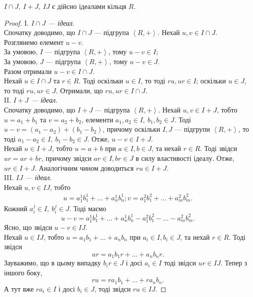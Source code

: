 \documentclass{math_library}
\begin{document}
\begin{proposition}
$I \cap J,\ I + J,\ IJ$ є дійсно ідеалами кільця $R$.
\end{proposition}

\begin{proof}
I. \textit{$I \cap J$ --- ідеал}.\\
Спочатку доводимо, що $I \cap J$ --- підгрупа $\left< R, + \right>$. Нехай $u,v \in I \cap J$. Розглянемо елемент $u-v$.\\
За умовою, $I$ --- підгрупа $\left<R,+\right>$, тому $u-v \in I$;\\
За умовою, $J$ --- підгрупа $\left<R,+\right>$, тому $u-v \in J$.\\
Разом отримали $u-v \in I \cap J$.\\
Нехай $u \in I \cap J$ та $r \in R$. Тоді оскільки $u \in I$, то тоді $ru, ur \in I$; оскільки $u \in J$, то тоді $ru, ur \in J$. Отримали, що $ru, ur \in I \cap J$.
\bigskip \\
II. \textit{$I+J$ --- ідеал}.\\
Спочатку доводимо, що $I + J$ --- підгрупа $\left< R, + \right>$. Нехай $u,v \in I + J$, тобто $u = a_1 + b_1$ та $v = a_2 + b_2$, елементи $a_1,a_2 \in I,\ b_1,b_2 \in J$. Тоді $u - v = (a_1 - a_2) + (b_1 - b_2)$, причому оскільки $I,J$ --- підгрупи $\left< R,+ \right>$, то тоді $a_1 - a_2 \in I,\ b_1 - b_2 \in J$. Отже, $u-v \in I+J$.\\
Нехай $u \in I+J$, тобто $u = a+b$ при $a \in I,b \in J$, та нехай $r \in R$. Тоді звідси $ur = ar + br$, причому звідси $ar \in I, br \in J$ в силу властивості ідеалу. Отже, $ur \in I+J$. Аналогічним чином доводиться $ru \in I+J$.
\bigskip \\
III. \textit{$IJ$ --- ідеал}.\\
Нехай $u,v \in IJ$, тобто
\begin{align*}
u = a_1^1 b_1^1 + \dots + a_n^1 b_n^1;
v = a_1^2 b_1^2 + \dots + a_m^2 b_m^2.
\end{align*}
Кожний $a_i^j \in I,\ b_i^j \in J$. Тоді маємо
\[
u - v = a_1^1 b_1^1 + \dots + a_n^1 b_n^1 - a_1^2 b_1^2 - \dots - a_m^2 b_m^2.
\]
Ясно, що звідси $u - v \in IJ$.\\
Нехай $u \in IJ$, тобто $u = a_1b_1 + \dots + a_nb_n$ при $a_i \in I, b_i \in J$, та нехай $r \in R$. Тоді звідси
\[
ur = a_1 b_1 r + \dots + a_n b_n r.
\]
Зауважимо, що в цьому випадку $b_i r \in J$ і досі $a_i \in I$ тоді звідси $ur \in IJ$. Тепер з іншого боку, 
\[
ru = r a_1 b_1 + \dots + r a_n b_n.
\]
А тут вже $r a_i \in I$ і досі $b_i \in J$, тоді звідси $ru \in IJ$.
\end{proof}
\end{document}
